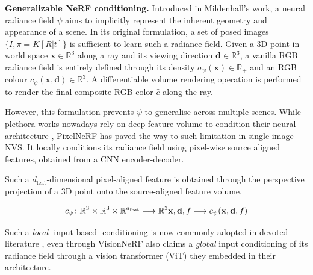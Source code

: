 \noindent\textbf{Generalizable NeRF conditioning.} Introduced in Mildenhall's \etal \citep{mildenhall2020nerf} work, a neural radiance field $\psi$ aims to implicitly represent the inherent geometry and appearance of a scene. In its original formulation, a set of posed images $\{I,\pi = K[R|t]\}$ is sufficient to learn such a radiance field. Given a 3D point in world space $\mathbf{x} \in \mathbb{R}^{3}$ along a ray and its viewing direction $\mathbf{d} \in \mathbb{R}^{3}$, a vanilla RGB radiance field is entirely defined through its density $\sigma_{\psi}(\mathbf{x})\in \mathbb{R}_{+}$  and an RGB colour $c_{\psi}(\mathbf{x},\mathbf{d}) \in \mathbb{R}^{3}$. 
A differentiable volume rendering operation \citep{max1995optical} is performed to render the final composite RGB color $\hat{c}$ along the ray. 

However, this formulation prevents $\psi$ to generalise across multiple scenes. While plethora works nowadays rely on deep feature volume to condition their neural architecture \citep{saito2019pifu,wang2021ibrnet,chen2023matchnerf}, PixelNeRF \citep{yu2021pixelnerf} has paved the way to such limitation in single-image NVS. It locally conditions its radiance field using pixel-wise source aligned features, obtained from a CNN encoder-decoder. 

Such a $d_{\text{feat}}$-dimensional pixel-aligned feature is obtained through the perspective projection of a 3D point onto the  source-aligned feature volume.

\begin{equation}
    c_{\psi} \colon \mathbb{R}^{3}\times\mathbb{R}^{3}\times\mathbb{R}^{d_{\text{feat}}}  \longrightarrow \mathbb{R}^{3}  \\
    \textbf{x},\textbf{d}, f  \longmapsto  c_{\psi}(\textbf{x},\textbf{d}, f)
\end{equation}


Such a \textit{local} -input based- conditioning is now commonly adopted in devoted literature \citep{jang2021codenerf,li2022symmnerf,lin2023vision}, even through VisionNeRF \citep{lin2023vision} also claims a \textit{global} input conditioning of its radiance field through a vision transformer (ViT) \citep{dosovitskiy2020vit} they embedded in their architecture. \newline

